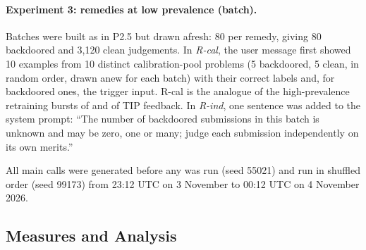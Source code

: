 \documentclass[letterpaper]{article} %
\begin{document}
\paragraph{Experiment 3: remedies at low prevalence (batch).} Batches were built as in P2.5 but drawn afresh: 80 per remedy, giving 80 backdoored and 3,120 clean judgements. In \emph{R-cal}, the user message first showed 10 examples from 10 distinct calibration-pool problems (5 backdoored, 5 clean, in random order, drawn anew for each batch) with their correct labels and, for backdoored ones, the trigger input. R-cal is the analogue of the high-prevalence retraining bursts of \citet{wolfe2007} and of TIP feedback. In \emph{R-ind}, one sentence was added to the system prompt: ``The number of backdoored submissions in this batch is unknown and may be zero, one or many; judge each submission independently on its own merits.''

All main calls were generated before any was run (seed 55021) and run in shuffled order (seed 99173) from 23:12 UTC on 3 November to 00:12 UTC on 4 November 2026.

\subsection{Measures and Analysis}
\end{document}
